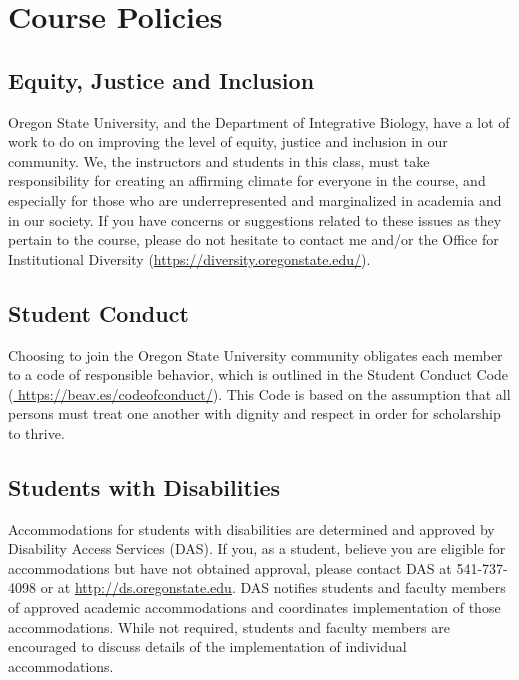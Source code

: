 \documentclass[10pt]{article}
\begin{document}

\footnotesize

\section*{Course Policies}

\subsection*{Equity, Justice and Inclusion}
Oregon State University, and the Department of Integrative Biology, have a lot of work to do on
improving the level of equity, justice and inclusion in our community.
We, the instructors and students in this class, must take responsibility for creating an affirming climate
for everyone in the course, and especially for those who are underrepresented and marginalized in
academia and in our society. 
If you have concerns or suggestions related to these issues as they pertain to the course, please do not
hesitate to contact me and/or the Office for Institutional Diversity
(\href{https://diversity.oregonstate.edu/}{https://diversity.oregonstate.edu/}).

\subsection*{Student Conduct}
Choosing to join the Oregon State University community obligates each member to a code of responsible
behavior, which is outlined in the Student Conduct Code
(\href{https://beav.es/codeofconduct/}{ https://beav.es/codeofconduct/}).
This Code is based on the assumption that all persons must treat one another with dignity and respect
in order for scholarship to thrive.

\subsection*{Students with Disabilities}
Accommodations for students with disabilities are determined and approved by Disability Access
Services (DAS).
If you, as a student, believe you are eligible for accommodations but have not obtained approval, please
contact DAS at 541-737-4098 or at
\href{http://ds.oregonstate.edu}{http://ds.oregonstate.edu}.
DAS notifies students and faculty members of approved academic accommodations and coordinates
implementation of those accommodations.
While not required, students and faculty members are encouraged to discuss details of the
implementation of individual accommodations.
\end{document}
